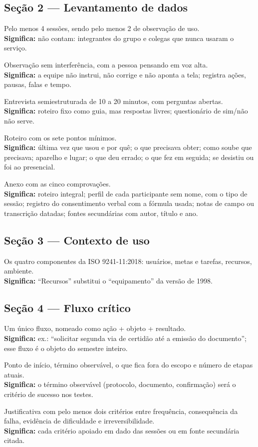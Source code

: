 \documentclass[11pt,a4paper]{article}
\newcommand{\obs}[1]{\\{\small\color{cinza}\textbf{Significa:} #1}}
\begin{document}
\subsection{Seção 2 --- Levantamento de dados}
\begin{checks}
  \item Pelo menos 4 sessões, sendo pelo menos 2 de observação de uso.
    \obs{não contam: integrantes do grupo e colegas que nunca usaram o serviço.}
  \item Observação sem interferência, com a pessoa pensando em voz alta.
    \obs{a equipe não instrui, não corrige e não aponta a tela; registra ações, pausas, falas e tempo.}
  \item Entrevista semiestruturada de 10 a 20 minutos, com perguntas abertas.
    \obs{roteiro fixo como guia, mas respostas livres; questionário de sim/não não serve.}
  \item Roteiro com os sete pontos mínimos.
    \obs{última vez que usou e por quê; o que precisava obter; como soube que precisava; aparelho e lugar; o que deu errado; o que fez em seguida; se desistiu ou foi ao presencial.}
  \item Anexo com as cinco comprovações.
    \obs{roteiro integral; perfil de cada participante sem nome, com o tipo de sessão; registro do consentimento verbal com a fórmula usada; notas de campo ou transcrição datadas; fontes secundárias com autor, título e ano.}
\end{checks}

\subsection{Seção 3 --- Contexto de uso}
\begin{checks}
  \item Os quatro componentes da ISO 9241-11:2018: usuários, metas e tarefas, recursos, ambiente.
    \obs{``Recursos'' substitui o ``equipamento'' da versão de 1998.}
\end{checks}

\subsection{Seção 4 --- Fluxo crítico}
\begin{checks}
  \item Um único fluxo, nomeado como ação + objeto + resultado.
    \obs{ex.: ``solicitar segunda via de certidão até a emissão do documento''; esse fluxo é o objeto do semestre inteiro.}
  \item Ponto de início, término observável, o que fica fora do escopo e número de etapas atuais.
    \obs{o término observável (protocolo, documento, confirmação) será o critério de sucesso nos testes.}
  \item Justificativa com pelo menos dois critérios entre frequência, consequência da falha, evidência de dificuldade e irreversibilidade.
    \obs{cada critério apoiado em dado das sessões ou em fonte secundária citada.}
\end{checks}
\end{document}
